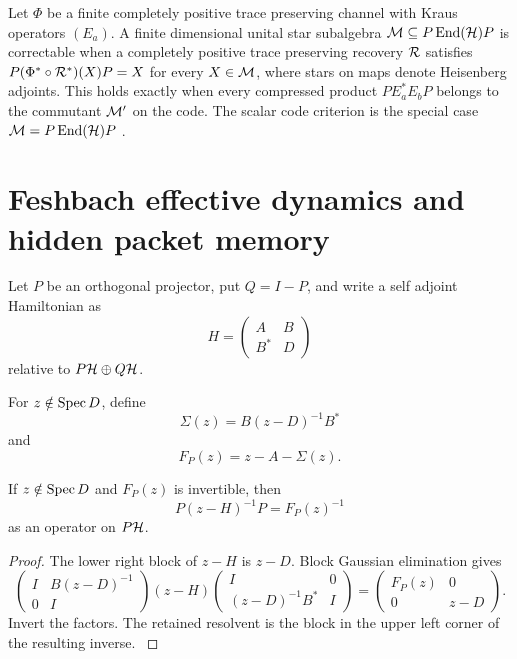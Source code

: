\begin{standardfact}\label{strong:standardfact:003}\label{strong:fact:operator_qec}
Let \(\Phi\) be a finite completely positive trace preserving channel with Kraus operators \((E_a)\). A finite dimensional unital star subalgebra \(\Mcal\subseteq P\End(\Hcal)P\) is correctable when a completely positive trace preserving recovery \(\Rcal\) satisfies \(P(\Phi^*\circ\Rcal^*)(X)P=X\) for every \(X\in\Mcal\), where stars on maps denote Heisenberg adjoints. This holds exactly when every compressed product \(PE_a^*E_bP\) belongs to the commutant \(\Mcal'\) on the code. The scalar code criterion is the special case \(\Mcal=P\End(\Hcal)P\) \cite{BenyKempfKribs2007}.
\end{standardfact}

\section{Feshbach effective dynamics and hidden packet memory}\label{strong:section:009}\label{strong:sec:feshbach}

Let \(P\) be an orthogonal projector, put \(Q=I-P\), and write a self adjoint Hamiltonian as
\[
H=
\begin{pmatrix}
A&B\\
B^*&D
\end{pmatrix}
\]
relative to \(P\Hcal\oplus Q\Hcal\).

\begin{definition}\label{strong:definition:007}\label{strong:def:feshbach_map}
For \(z\notin\operatorname{Spec} D\), define
\[
\Sigma(z)=B(z-D)^{-1}B^*
\]
and
\[
F_P(z)=z-A-\Sigma(z).
\]
\end{definition}

\begin{theorem}\label{strong:theorem:029}\label{strong:thm:feshbach_resolvent}
If \(z\notin\operatorname{Spec} D\) and \(F_P(z)\) is invertible, then
\[
P(z-H)^{-1}P=F_P(z)^{-1}
\]
as an operator on \(P\Hcal\).
\end{theorem}

\begin{proof}\label{strong:proof:044}
The lower right block of \(z-H\) is \(z-D\). Block Gaussian elimination gives
\[
\begin{pmatrix}
I&B(z-D)^{-1}\\
0&I
\end{pmatrix}
(z-H)
\begin{pmatrix}
I&0\\
(z-D)^{-1}B^*&I
\end{pmatrix}
=
\begin{pmatrix}
F_P(z)&0\\
0&z-D
\end{pmatrix}.
\]
Invert the factors. The retained resolvent is the block in the upper left corner of the resulting inverse.
\label{strong:proof:044:end}\end{proof}

